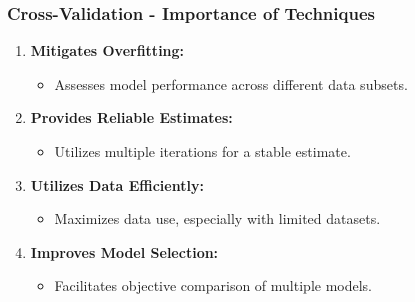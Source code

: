 \documentclass[aspectratio=169]{beamer}
\begin{document}
\begin{frame}[fragile]
    \frametitle{Cross-Validation - Importance of Techniques}
    
    \begin{enumerate}
        \item \textbf{Mitigates Overfitting:}
            \begin{itemize}
                \item Assesses model performance across different data subsets.
            \end{itemize}
        
        \item \textbf{Provides Reliable Estimates:}
            \begin{itemize}
                \item Utilizes multiple iterations for a stable estimate.
            \end{itemize}
        
        \item \textbf{Utilizes Data Efficiently:}
            \begin{itemize}
                \item Maximizes data use, especially with limited datasets.
            \end{itemize}
        
        \item \textbf{Improves Model Selection:}
            \begin{itemize}
                \item Facilitates objective comparison of multiple models.
            \end{itemize}
    \end{enumerate}
\end{frame}
\end{document}
